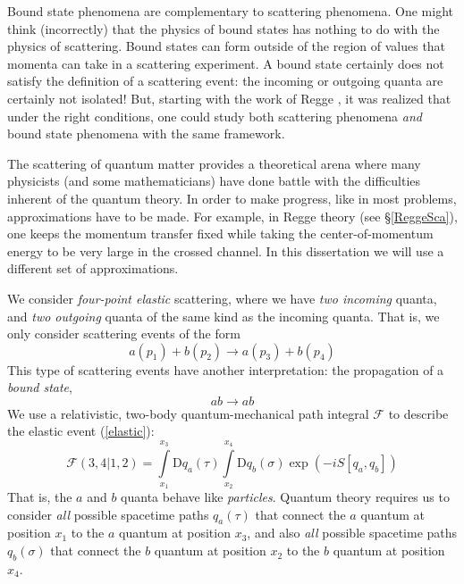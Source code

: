 Bound state phenomena are complementary to scattering phenomena. One might think (incorrectly) that the physics of bound states has nothing to do with the physics of scattering. Bound states can form outside of the region of values that momenta can take in a scattering experiment. A bound state certainly does not satisfy the definition of a scattering event: the incoming or outgoing quanta are certainly not isolated! But, starting with the work of Regge \cite{Regge:1959mz,Regge:1960zc}, it was realized that under the right conditions, one could study both scattering phenomena \textit{and} bound state phenomena with the same framework.

The scattering of quantum matter provides a theoretical arena where many physicists (and some mathematicians) have done battle with the difficulties inherent of the quantum theory. In order to make progress, like in most problems, approximations have to be made. For example, in Regge theory (see \S\ref{ReggeSca}), one keeps the momentum transfer fixed while taking the center-of-momentum energy to be very large in the crossed channel. In this dissertation we will use a different set of approximations.

We consider \textit{four-point elastic} scattering, where we have \textit{two incoming} quanta, and \textit{two outgoing} quanta of the same kind as the incoming quanta. That is, we only consider scattering events of the form
\begin{equation}
	a(p_{1}) + b(p_{2}) \longrightarrow a(p_{3}) + b(p_{4}) \label{elastic}
\end{equation}
This type of scattering events have another interpretation: the propagation of a \textit{bound state},
\begin{equation}
	ab \longrightarrow ab
\end{equation}
We use a relativistic, two-body quantum-mechanical path integral $\mathcal{F}$ to describe the elastic event (\ref{elastic}):
\begin{equation}
	\mathcal{F}(3,4|1,2) = \int\limits_{x_{1}}^{x_{3}} \mathrm{D}q_{a}(\tau) \int\limits_{x_{2}}^{x_{4}} \mathrm{D}q_{b}(\sigma) \exp{\left( - i S[q_{a}, q_{b}] \right)}
\end{equation}
That is, the $a$ and $b$ quanta behave like \textit{particles}. Quantum theory requires us to consider \textit{all} possible spacetime paths $q_{a}(\tau)$ that connect the $a$ quantum at position $x_{1}$ to the $a$ quantum at position $x_{3}$, and also \textit{all} possible spacetime paths $q_{b}(\sigma)$ that connect the $b$ quantum at position $x_{2}$ to the $b$ quantum at position $x_{4}$.

